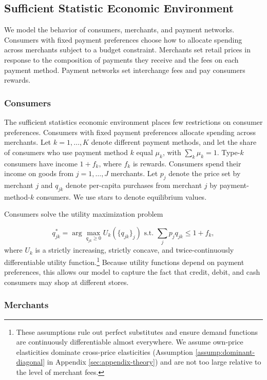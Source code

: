 \documentclass[main.tex]{subfiles}
\begin{document}
\subsection{Sufficient Statistic Economic Environment}

We model the behavior of consumers, merchants, and payment networks.
Consumers with fixed payment preferences choose how to allocate spending across merchants subject to a budget constraint.
Merchants set retail prices in response to the composition of payments they receive and the fees on each payment method.
Payment networks set interchange fees and pay consumers rewards.

\subsubsection{Consumers}
The sufficient statistics economic environment places few restrictions on consumer preferences.
Consumers with fixed payment preferences allocate spending across merchants.
Let $k=1,\ldots,K$ denote different payment methods, and let the share of consumers who use payment method $k$ equal $\mu_k$, with $\sum_k \mu_k=1$.
Type-$k$ consumers have income $1 + f_k$, where $f_k$ is rewards.
Consumers spend their income on goods from $j=1,\ldots,J$ merchants.
Let $p_j$ denote the price set by merchant $j$ and $q_{jk}$ denote per-capita purchases from merchant $j$ by payment-method-$k$ consumers.
We use stars to denote equilibrium values.

Consumers solve the utility maximization problem

\[q^{*}_{jk} = \arg\max_{q_{jk}\geq 0} U_k\left(\{q_{jk}\}_{j}\right) \text{ s.t. } \sum_j p_j q_{jk} \leq 1 + f_k,\]
where $U_k$ is a strictly increasing, strictly concave, and twice-continuously differentiable utility function.\footnote{ These assumptions rule out perfect substitutes and ensure demand functions are continuously differentiable almost everywhere.
We assume own-price elasticities dominate cross-price elasticities (Assumption \ref{assump:dominant-diagonal} in Appendix \ref{sec:appendix-theory}) and are not too large relative to the level of merchant fees. } Because utility functions depend on payment preferences, this allows our model to capture the fact that credit, debit, and cash consumers may shop at different stores.

\subsubsection{Merchants}
\end{document}
